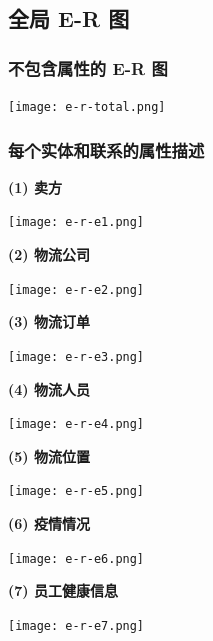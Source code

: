 \documentclass[12pt]{article}
\begin{document}
\subsection{全局 E-R 图 }

\subsubsection{不包含属性的 E-R 图}

\begin{center}
	\texttt{[image: e-r-total.png]}
\end{center}

\subsubsection{每个实体和联系的属性描述}

\noindent \textbf{(1) 卖方}

\begin{center}
	\texttt{[image: e-r-e1.png]}
\end{center}

\noindent \textbf{(2) 物流公司}

\begin{center}
	\texttt{[image: e-r-e2.png]}
\end{center}

\noindent \textbf{(3) 物流订单}

\begin{center}
	\texttt{[image: e-r-e3.png]}
\end{center}

\noindent \textbf{(4) 物流人员}

\begin{center}
	\texttt{[image: e-r-e4.png]}
\end{center}


\noindent \textbf{(5) 物流位置}

\begin{center}
	\texttt{[image: e-r-e5.png]}
\end{center}

\newpage
\noindent \textbf{(6) 疫情情况}

\begin{center}
	\texttt{[image: e-r-e6.png]}
\end{center}

\noindent \textbf{(7) 员工健康信息}

\begin{center}
	\texttt{[image: e-r-e7.png]}
\end{center}
\end{document}
